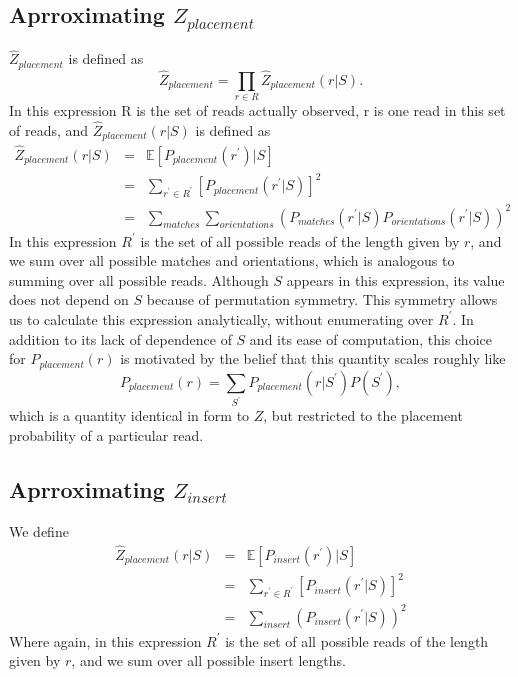 \documentclass[phd,tocprelim]{cornell}
\begin{document}
\subsection{Aprroximating $Z_{placement}$} %
\label{sub:Aprroximating Z_placement}

$\hat{Z}_{placement}$ is defined as
\begin{equation}
    \hat{Z}_{placement} = \prod_{r \in R} \hat{Z}_{placement}(r|S).
\end{equation}
In this expression R is the set of reads actually observed, r is one read in this set of reads, and $\hat{Z}_{placement}(r|S)$ is defined as
\begin{equation}
    \begin{array}{lcl}
        \hat{Z}_{placement}(r|S) & = & \mathbb{E}\left[P_{placement}\left(r^{\prime}\right)|S\right] \\
        & = & \sum_{r^{\prime} \in R^{\prime}} \left[ P_{placement}(r^{\prime}|S)\right]^{2} \\
        & = & \sum_{matches} \sum_{orientations} \left(P_{matches}(r^{\prime}|S)P_{orientations}(r^{\prime}|S)\right)^{2}
    \end{array}
\end{equation}
In this expression $R^{\prime}$ is the set of all possible reads of the length given by $r$, and we sum over all possible matches and orientations, which is analogous to summing over all possible reads. Although $S$ appears in this expression, its value does not depend on $S$ because of permutation symmetry. This symmetry allows us to calculate this expression analytically, without enumerating over $R^{\prime}$.  In addition to its lack of dependence of $S$ and its ease of computation, this choice for $P_{placement}(r)$ is motivated by the belief that this quantity scales roughly like
\begin{equation}
    P_{placement}(r) = \sum_{S^{\prime}}P_{placement}(r|S^{\prime})P(S^{\prime}),
\end{equation}
which is a quantity identical in form to $Z$, but restricted to the placement probability of a particular read.


\subsection{Aprroximating $Z_{insert}$} %
\label{sub:Aprroximating Z_insert}

We define
\begin{equation}
    \begin{array}{lcl}
        \hat{Z}_{placement}(r|S) & = & \mathbb{E}\left[P_{insert}\left(r^{\prime}\right)|S\right] \\
        & = & \sum_{r^{\prime} \in R^{\prime}} \left[ P_{insert}(r^{\prime}|S)\right]^{2} \\
        & = & \sum_{insert} \left(P_{insert}(r^{\prime}|S)\right)^{2}
    \end{array}
\end{equation}
Where again, in this expression $R^{\prime}$ is the set of all possible reads of the length given by $r$, and we sum over all possible insert lengths.
\end{document}
